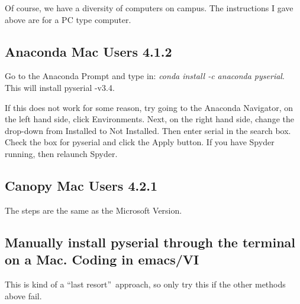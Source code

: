 Of course, we have a diversity of computers on campus. The instructions I
gave above are for a PC type computer.

\subsection{Anaconda Mac Users 4.1.2}

Go to the Anaconda Prompt and type in: \textit{conda install -c anaconda
pyserial}. This will install pyserial -v3.4.


If this does not work for some reason, try going to the Anaconda Navigator,
on the left hand side, click Environments. Next, on the right hand side,
change the drop-down from Installed to Not Installed. Then enter serial in
the search box. Check the box for pyserial and click the Apply button. If
you have Spyder running, then relaunch Spyder.


\subsection{Canopy Mac Users 4.2.1}

The steps are the same as the Microsoft Version.

\subsection{Manually install pyserial through the terminal on a Mac. Coding
in emacs/VI}

This is kind of a \textquotedblleft last resort\textquotedblright\ approach,
so only try this if the other methods above fail.

